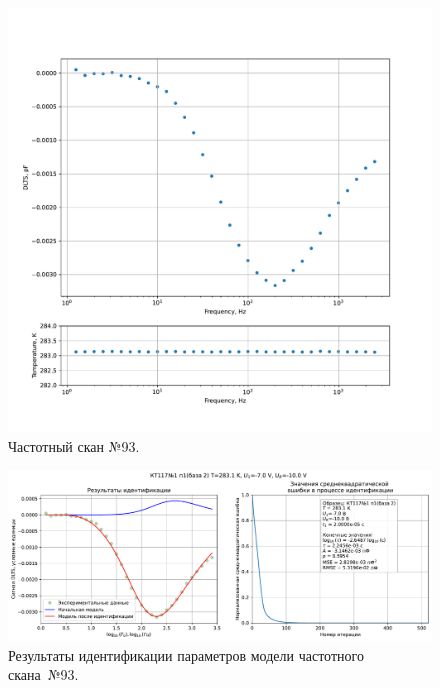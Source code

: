 \begin{figure}[!ht]
    \centering
    \includegraphics[width=1\textwidth]{../plots/КТ117№1_п1(база 2)_2500Гц-1Гц_1пФ_+10С_-7В-10В_50мВ_20мкс_шаг_0,1.pdf}
    \caption{Частотный скан №93.}
    \label{pic:frequency_scan_93}
\end{figure}

\begin{figure}[!ht]
    \centering
    \includegraphics[width=1\textwidth]{../plots/КТ117№1_п1(база 2)_2500Гц-1Гц_1пФ_+10С_-7В-10В_50мВ_20мкс_шаг_0,1_model.pdf}
    \caption{Результаты идентификации параметров модели частотного скана~№93.}
    \label{pic:frequency_scan_model93}
\end{figure}

\pagebreak


